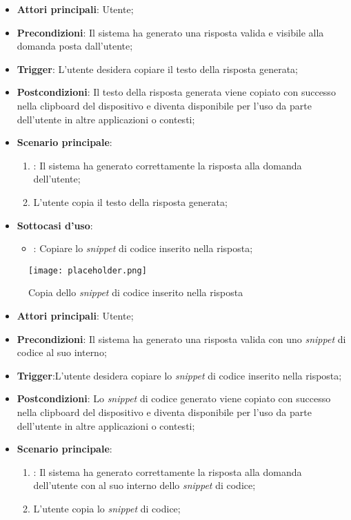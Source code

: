 \begin{itemize}
    \item \textbf{Attori principali}: Utente;
    \item \textbf{Precondizioni}: Il sistema ha generato una risposta valida e visibile alla domanda posta dall'utente;
    \item \textbf{Trigger}: L'utente desidera copiare il testo della risposta generata;
    \item \textbf{Postcondizioni}: Il testo della risposta generata viene copiato con successo nella clipboard del dispositivo e diventa disponibile per l'uso da parte dell'utente in altre applicazioni o contesti;
    \item \textbf{Scenario principale}:
    \begin{enumerate}
        \item {}: Il sistema ha generato correttamente la risposta alla domanda dell'utente;
        \item L'utente copia il testo della risposta generata;
    \end{enumerate}

    \item \textbf{Sottocasi d'uso}:
    \begin{itemize}
        \item {}: Copiare lo \emph{snippet} di codice inserito nella risposta;
    \end{itemize}
\end{itemize}


\hypertarget{UC8}{}

\begin{figure}[h]
    \centering
    \texttt{[image: placeholder.png]}
    \caption{Copia dello \emph{snippet} di codice inserito nella risposta}
\end{figure}

\begin{itemize}
    \item \textbf{Attori principali}: Utente;
    \item \textbf{Precondizioni}: Il sistema ha generato una risposta valida con uno \emph{snippet} di codice al suo interno;
    \item \textbf{Trigger}:L'utente desidera copiare lo \emph{snippet} di codice inserito nella risposta;
    \item \textbf{Postcondizioni}: Lo \emph{snippet} di codice generato viene copiato con successo nella clipboard del dispositivo e diventa disponibile per l'uso da parte dell'utente in altre applicazioni o contesti;
    \item \textbf{Scenario principale}:
    \begin{enumerate}
        \item {}: Il sistema ha generato correttamente la risposta alla domanda dell'utente con al suo interno dello \emph{snippet} di codice;
        \item L'utente copia lo \emph{snippet} di codice;
    \end{enumerate}
\end{itemize}


